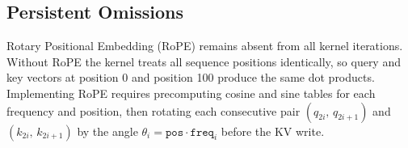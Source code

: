 \subsection{Persistent Omissions}
\label{subsec:forward_limitations}

Rotary Positional Embedding (RoPE) remains absent from all kernel
iterations. Without RoPE the kernel treats all sequence positions
identically, so query and key vectors at position 0 and position 100
produce the same dot products. Implementing RoPE requires precomputing
cosine and sine tables for each frequency and position, then rotating
each consecutive pair $(q_{2i},\,q_{2i+1})$ and $(k_{2i},\,k_{2i+1})$
by the angle $\theta_i = \texttt{pos} \cdot \texttt{freq}_i$ before
the KV write.
